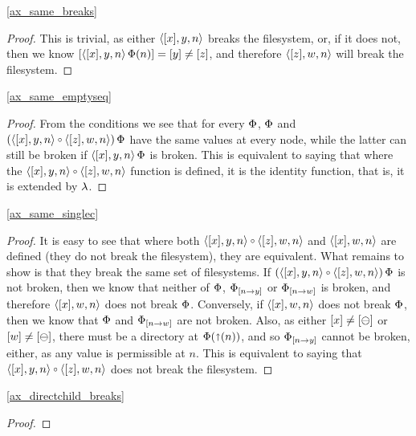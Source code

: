 \cref{ax_same_breaks}

\begin{proof}
This is trivial, as either $\langle{[x],y,n}\rangle$ breaks the filesystem, or, if it does not, then
we know $[\langle{[x],y,n}\rangle\,\Phi(n)]=[y]\neq [z]$, and therefore $\langle{[z],w,n}\rangle$ will break the filesystem.
\end{proof}

\cref{ax_same_emptyseq}

\begin{proof}
From the conditions we see that for every $\Phi$,
$\Phi$ and $(\cxynv\cc\czwnv)\aFS$ have the same values at every node,
while the latter can still be broken if $\langle{[x],y,n}\rangle\,\Phi$ is broken.
This is equivalent to saying that where the $\cxynv\cc\czwnv$ function is defined,
it is the identity function, that is, it is extended by $\lambda$.
\end{proof}

\cref{ax_same_singlec}

\begin{proof}
It is easy to see that where both $\cxynv\cc \czwnv$ and $\langle{[x],w,n}\rangle$ are defined
(they do not break the filesystem), they are equivalent.
What remains to show is that they break the same set of filesystems.
If $(\cxynv\cc \czwnv)\aFS$ is not broken, then we know that neither of
$\Phi$, ${\Phi}_{[{n}\rightarrow{y}]}$ or ${\Phi}_{[{n}\rightarrow{w}]}$ is broken,
and therefore $\langle{[x],w,n}\rangle$ does not break $\Phi$.
Conversely, if $\langle{[x],w,n}\rangle$ does not break $\Phi$, then 
we know that $\Phi$ and ${\Phi}_{[{n}\rightarrow{w}]}$ are not broken.
Also, as
either $[x]\neq[\ominus]$ or $[w]\neq[\ominus]$,
there must be a directory at $\Phi(\mathord{\shortuparrow}({n}))$,
and so ${\Phi}_{[{n}\rightarrow{y}]}$ cannot be broken, either,
as any value is permissible at $n$.
This is equivalent to saying that $\cxynv\cc \czwnv$ does not break the filesystem.
\end{proof}

\cref{ax_directchild_breaks}

\begin{proof}
\end{proof}


